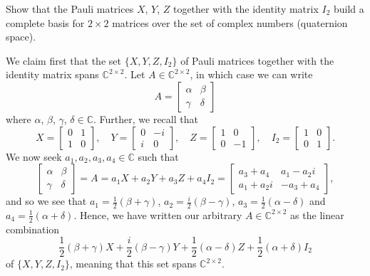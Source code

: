 \documentclass{../../../kin_math}
\begin{document}
\begin{questions}
  \question Show that the Pauli matrices $X$, $Y$, $Z$ together with the identity matrix $I_2$ build a complete basis for $2 \times 2$ matrices over the set of complex numbers (quaternion space).
  \begin{solution}
    We claim first that the set $\{X, Y, Z, I_2\}$ of Pauli matrices together with the identity matrix spans $\mathbb{C}^{2 \times 2}$. Let $A \in \mathbb{C}^{2 \times 2}$, in which case we can write
    \begin{equation*}
      A = \begin{bmatrix} \alpha & \beta \\ \gamma & \delta \end{bmatrix}
    \end{equation*}
    where $\alpha$, $\beta$, $\gamma$, $\delta \in \mathbb{C}$. Further, we recall that
    \begin{equation*}
      X = \begin{bmatrix} 0 & 1 \\ 1 & 0 \end{bmatrix}, \quad Y = \begin{bmatrix} 0 & -i \\ i & 0 \end{bmatrix}, \quad Z = \begin{bmatrix} 1 & 0 \\ 0 & -1 \end{bmatrix}, \quad I_2 = \begin{bmatrix} 1 & 0 \\ 0 & 1 \end{bmatrix}.
    \end{equation*}
    We now seek $a_1, a_2, a_3, a_4 \in \mathbb{C}$ such that
    \begin{equation*}
      \begin{bmatrix} \alpha & \beta \\ \gamma & \delta \end{bmatrix} = A = a_1 X + a_2 Y + a_3 Z + a_4 I_2 = \begin{bmatrix} a_3 + a_4 & a_1 - a_2i \\ a_1 + a_2i & -a_3 + a_4 \end{bmatrix},
    \end{equation*}
    and so we see that $a_1 = \frac{1}{2}(\beta + \gamma)$, $a_2 = \frac{i}{2}(\beta - \gamma)$, $a_3 = \frac{1}{2}(\alpha - \delta)$ and $a_4 = \frac{1}{2}(\alpha + \delta)$. Hence, we have written our arbitrary $A \in \mathbb{C}^{2 \times 2}$ as the linear combination
    \begin{equation*}
      \frac{1}{2}(\beta + \gamma)X + \frac{i}{2}(\beta - \gamma)Y + \frac{1}{2}(\alpha - \delta)Z + \frac{1}{2}(\alpha + \delta)I_2
    \end{equation*}
    of $\{X, Y, Z, I_2\}$, meaning that this set spans $\mathbb{C}^{2 \times 2}$.


\end{solution}
\end{questions}
\end{document}
